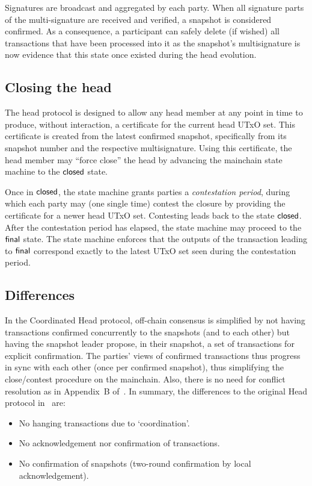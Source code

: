 Signatures are broadcast and aggregated by each party. When all signature parts
of the multi-signature are received and verified, a snapshot is considered
confirmed. As a consequence, a participant can safely delete (if wished) all
transactions that have been processed into it as the snapshot's multisignature
is now evidence that this state once existed during the head evolution.

\subsection{Closing the head}

The head protocol is designed to allow any head member at any point in time to
produce, without interaction, a certificate for the current head UTxO set. This
certificate is created from the latest confirmed snapshot, specifically from its
snapshot number and the respective multisignature. Using this certificate, the
head member may ``force close'' the head by advancing the mainchain state
machine to the $\mathsf{closed}$ state.

Once in $\mathsf{closed}$, the state machine grants parties a \emph{contestation
  period}, during which each party may (one single time) contest the closure by
providing the certificate for a newer head UTxO set. Contesting leads back to
the state $\mathsf{closed}$. After the contestation period has elapsed, the state
machine may proceed to the $\mathsf{final}$ state. The state machine enforces that the
outputs of the transaction leading to $\mathsf{final}$ correspond exactly to the
latest UTxO set seen during the contestation period.

\subsection{Differences}

In the Coordinated Head protocol, off-chain consensus is simplified by not having transactions
confirmed concurrently to the snapshots (and to each other) but having the snapshot leader propose,
in their snapshot, a set of transactions for explicit confirmation. The parties' views of confirmed
transactions thus progress in sync with each other (once per confirmed snapshot), thus simplifying
the close/contest procedure on the mainchain. Also, there is no need for conflict resolution as
in Appendix~B of~\cite{hydrahead20}. In summary, the differences to the original Head protocol in~\cite{hydrahead20} are:

\begin{itemize}
  \item No hanging transactions due to `coordination'.
  \item No acknowledgement nor confirmation of transactions.
  \item No confirmation of snapshots (two-round confirmation by local acknowledgement).
\end{itemize}

